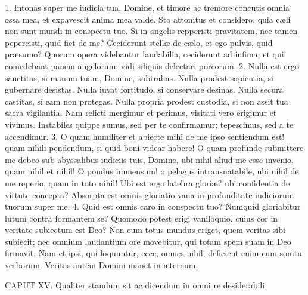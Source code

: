 \documentclass[twoside]{article}
\begin{document}
1. Intonas super me iudicia tua, Domine, et timore ac tremore concutis omnia ossa mea, et expavescit anima mea valde. Sto attonitus et considero, quia cæli non sunt mundi in conspectu tuo. Si in angelis repperisti pravitatem, nec tamen pepercisti, quid fiet de me? Ceciderunt stellæ de cælo, et ego pulvis, quid præsumo? Quorum opera videbantur laudabilia, ceciderunt ad infima, et qui comedebant panem angelorum, vidi siliquis delectari porcorum.
2. Nulla est ergo sanctitas, si manum tuam, Domine, subtrahas. Nulla prodest sapientia, si gubernare desistas. Nulla iuvat fortitudo, si conservare desinas. Nulla secura castitas, si eam non protegas. Nulla propria prodest custodia, si non assit tua sacra vigilantia. Nam relicti mergimur et perimus, visitati vero erigimur et vivimus. Instabiles quippe sumus, sed per te confirmamur; tepescimus, sed a te accendimur.
3. O quam humiliter et abiecte mihi de me ipso sentiendum est! quam nihili pendendum, si quid boni videar habere! O quam profunde submittere me debeo sub abyssalibus iudiciis tuis, Domine, ubi nihil aliud me esse invenio, quam nihil et nihil! O pondus immensum! o pelagus intransnatabile, ubi nihil de me reperio, quam in toto nihil! Ubi est ergo latebra gloriæ? ubi confidentia de virtute concepta? Absorpta est omnis gloriatio vana in profunditate iudiciorum tuorum super me.
4. Quid est omnis caro in conspectu tuo? Numquid gloriabitur lutum contra formantem se? Quomodo potest erigi vaniloquio, cuius cor in veritate subiectum est Deo? Non eum totus mundus eriget, quem veritas sibi subiecit; nec omnium laudantium ore movebitur, qui totam spem suam in Deo firmavit. Nam et ipsi, qui loquuntur, ecce, omnes nihil; deficient enim cum sonitu verborum. Veritas autem Domini manet in æternum.


CAPUT XV.
Qualiter standum sit ac dicendum in omni re desiderabili
\end{document}
